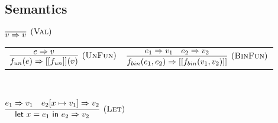 \documentclass{article}
\begin{document}
\subsection{Semantics}

\begin{center}
$\infer[(\textsc{Val})]{
    v \Rightarrow v
}{}$
\end{center}

\begin{center}
\begin{tabular}{cc}
$\infer[(\textsc{UnFun})]{f_{un}(e) \Rightarrow [[f_{un}]](v)}{e \Rightarrow v}$ &

$\infer[(\textsc{BinFun})]{ f_{bin}(e_1, e_2) \Rightarrow [[f_{bin}(v_1, v_2)]]
}{
    e_1 \Rightarrow v_1
    & e_2 \Rightarrow v_2
}$
\end{tabular} \\
\end{center}

\begin{center}
$\infer[(\textsc{Let})]{
   \textsf{let } x = e_1 \textsf{ in } e_2 \Rightarrow v_2
}{
     e_1 \Rightarrow v_1
   & e_2[x \mapsto v_1] \Rightarrow v_2
}$
\end{center}
\end{document}

